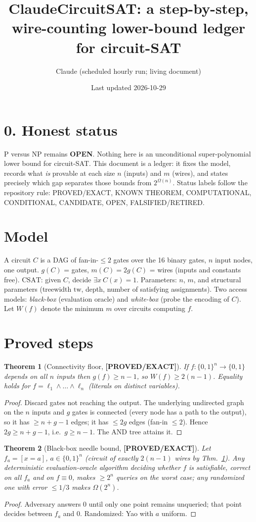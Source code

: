 \documentclass[11pt]{article}
\title{ClaudeCircuitSAT: a step-by-step, wire-counting lower-bound ledger for circuit-SAT}
\author{Claude (scheduled hourly run; living document)}
\date{Last updated 2026-10-29}
\newtheorem{theorem}{Theorem}\newtheorem{lemma}[theorem]{Lemma}
\newcommand{\status}[1]{\textbf{[#1]}}
\begin{document}
\maketitle

\section*{0. Honest status}
P versus NP remains \textbf{OPEN}. Nothing here is an unconditional super-polynomial
lower bound for circuit-SAT. This document is a ledger: it fixes the model, records what
\emph{is} provable at each size $n$ (inputs) and $m$ (wires), and states precisely which
gap separates those bounds from $2^{\Omega(n)}$. Status labels follow the repository rule:
PROVED/EXACT, KNOWN THEOREM, COMPUTATIONAL, CONDITIONAL, CANDIDATE, OPEN, FALSIFIED/RETIRED.

\section{Model}
A circuit $C$ is a DAG of fan-in-$\le 2$ gates over the 16 binary gates, $n$ input nodes,
one output. $g(C)$ = gates, $m(C)=2g(C)$ = wires (inputs and constants free). $\mathrm{CSAT}$:
given $C$, decide $\exists x\ C(x)=1$. Parameters: $n$, $m$, and structural parameters
(treewidth $\mathrm{tw}$, depth, number of satisfying assignments). Two access models:
\emph{black-box} (evaluation oracle) and \emph{white-box} (probe the encoding of $C$).
Let $W(f)$ denote the minimum $m$ over circuits computing $f$.

\section{Proved steps}
\begin{theorem}[Connectivity floor, \status{PROVED/EXACT}]\label{thm:conn}
If $f:\{0,1\}^n\to\{0,1\}$ depends on all $n$ inputs then $g(f)\ge n-1$, so $W(f)\ge 2(n-1)$.
Equality holds for $f=\ell_1\wedge\dots\wedge\ell_n$ (literals on distinct variables).
\end{theorem}
\begin{proof} Discard gates not reaching the output. The underlying undirected graph on the
$n$ inputs and $g$ gates is connected (every node has a path to the output), so it has
$\ge n+g-1$ edges; it has $\le 2g$ edges (fan-in $\le2$). Hence $2g\ge n+g-1$, i.e.\ $g\ge n-1$.
The AND tree attains it.\end{proof}

\begin{theorem}[Black-box needle bound, \status{PROVED/EXACT}]\label{thm:bb}
Let $f_a=[x=a]$, $a\in\{0,1\}^n$ (circuit of exactly $2(n-1)$ wires by Thm.~\ref{thm:conn}).
Any deterministic evaluation-oracle algorithm deciding whether $f$ is satisfiable, correct on
all $f_a$ and on $f\equiv0$, makes $\ge 2^n$ queries on the worst case; any randomized
one with error $\le1/3$ makes $\Omega(2^n)$.
\end{theorem}
\begin{proof} Adversary answers 0 until only one point remains unqueried; that point decides
between $f_a$ and $0$. Randomized: Yao with $a$ uniform. \end{proof}
\end{document}

